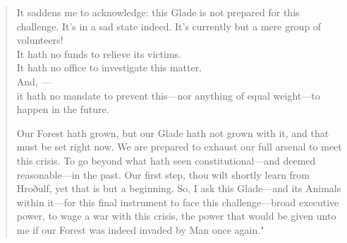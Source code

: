 \begin{quote}
		It saddens me to acknowledge: this Glade is not prepared for this challenge. It's in a sad state indeed. It's currently but a mere group of volunteers!\\
		It hath no funds to relieve its victims.\\
		It hath no office to investigate this matter.\\
		And, ---\\
		it hath no mandate to prevent this---nor anything of equal weight---to happen in the future.

		Our Forest hath grown, but our Glade hath not grown with it, and that must be set right now. We are prepared to exhaust our full arsenal to meet this crisis. To go beyond what hath seen constitutional---and deemed reasonable---in the past. Our first step, thou wilt shortly learn from Hroðulf, yet that is but a beginning. So, I ask this Glade---and its Animals within it---for this final instrument to face this challenge---broad executive power, to wage a war with this crisis, the power that would be given unto me if our Forest was indeed invaded by Man once again."
	\end{quote} 
\endgroup